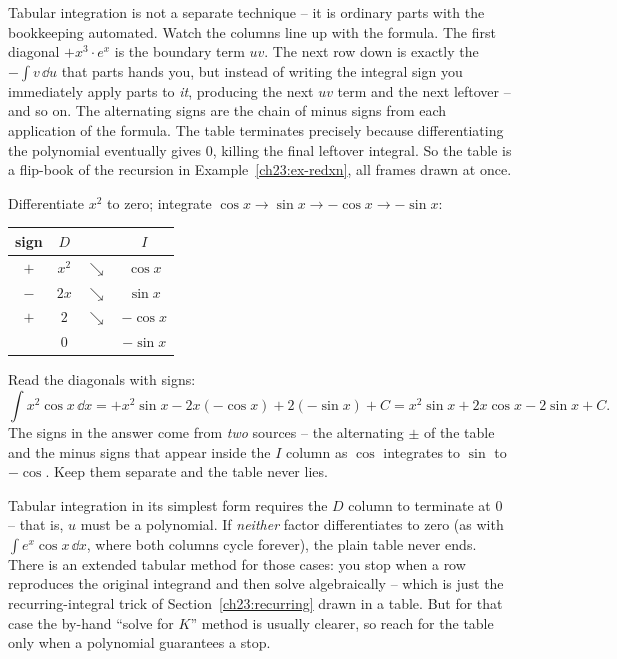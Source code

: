 \begin{whybox}
Tabular integration is not a separate technique -- it is ordinary parts with the
bookkeeping automated. Watch the columns line up with the formula. The first
diagonal $+x^3\cdot e^x$ is the boundary term $uv$. The next row down is exactly
the $-\int v\,\dd u$ that parts hands you, but instead of writing the integral
sign you immediately apply parts to \emph{it}, producing the next $uv$ term and
the next leftover -- and so on. The alternating signs are the chain of minus signs
from each application of the formula. The table terminates precisely because
differentiating the polynomial eventually gives $0$, killing the final leftover
integral. So the table is a flip-book of the recursion in
Example~\ref{ch23:ex-redxn}, all frames drawn at once.
\end{whybox}

\begin{example}
\label{ch23:ex-tabx2cos}
Differentiate $x^2$ to zero; integrate $\cos x \to \sin x \to -\cos x \to
-\sin x$:
\begin{center}
\begin{tabular}{c c c c}
\toprule
sign & $D$ & & $I$ \\
\midrule
$+$ & $x^2$ & $\searrow$ & $\cos x$ \\
$-$ & $2x$ & $\searrow$ & $\sin x$ \\
$+$ & $2$ & $\searrow$ & $-\cos x$ \\
& $0$ & & $-\sin x$ \\
\bottomrule
\end{tabular}
\end{center}
Read the diagonals with signs:
\[
\int x^2\cos x\,\dd x
= +x^2\sin x - 2x(-\cos x) + 2(-\sin x) + C
= x^2\sin x + 2x\cos x - 2\sin x + C.
\]
The signs in the answer come from \emph{two} sources -- the alternating $\pm$ of
the table and the minus signs that appear inside the $I$ column as $\cos$
integrates to $\sin$ to $-\cos$. Keep them separate and the table never lies.
\end{example}

\begin{trapbox}
Tabular integration in its simplest form requires the $D$ column to terminate at
$0$ -- that is, $u$ must be a polynomial. If \emph{neither} factor differentiates
to zero (as with $\int e^x\cos x\,\dd x$, where both columns cycle forever), the
plain table never ends. There is an extended tabular method for those cases: you
stop when a row reproduces the original integrand and then solve algebraically --
which is just the recurring-integral trick of Section~\ref{ch23:recurring} drawn
in a table. But for that case the by-hand ``solve for $K$'' method is usually
clearer, so reach for the table only when a polynomial guarantees a stop.
\end{trapbox}

